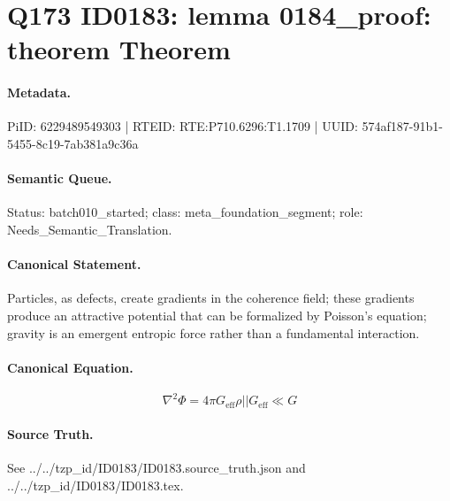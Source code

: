 \section*{Q173 ID0183: lemma 0184\_proof: theorem Theorem}
\paragraph{Metadata.}
PiID: 6229489549303 | RTEID: RTE:P710.6296:T1.1709 | UUID: 574af187-91b1-5455-8c19-7ab381a9c36a

\paragraph{Semantic Queue.}
Status: batch010\_started; class: meta\_foundation\_segment; role: Needs\_Semantic\_Translation.

\paragraph{Canonical Statement.}
Particles, as defects, create gradients in the coherence field; these gradients produce an attractive potential that can be formalized by Poisson's equation; gravity is an emergent entropic force rather than a fundamental interaction.

\paragraph{Canonical Equation.}
\[
\nabla^2 \Phi = 4\pi G_{\mathrm{eff}}\rho || G_{\mathrm{eff}} \ll G
\]

\paragraph{Source Truth.}
See ../../tzp\_id/ID0183/ID0183.source\_truth.json and ../../tzp\_id/ID0183/ID0183.tex.
